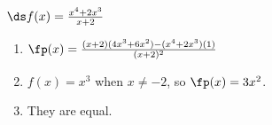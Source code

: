 {$\ds f(x)= \frac{x^4+2x^3}{x+2}$
}
{\begin{enumerate}
\item		$\fp(x) = \frac{(x+2)(4x^3+6x^2)-(x^4+2x^3)(1)}{(x+2)^2}$
\item		$f(x) = x^3$ when $x\neq -2$, so $\fp(x) = 3x^2$.
\item		They are equal.
\end{enumerate}
}
